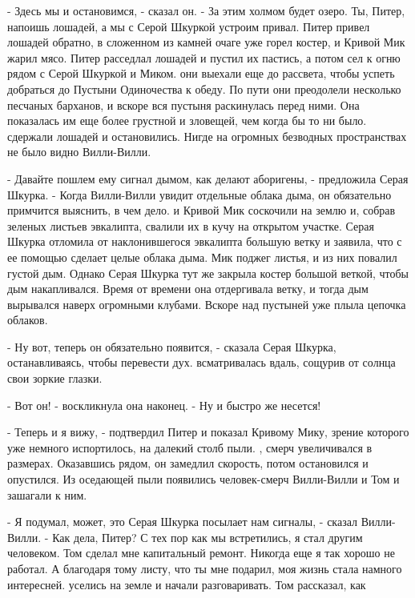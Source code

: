 \par- Здесь мы и остановимся, - сказал он. - За этим холмом будет 
озеро. Ты, Питер, напоишь лошадей, а мы с Серой Шкуркой устроим 
привал.
 Питер привел лошадей обратно, в сложенном из камней очаге 
уже горел костер, и Кривой Мик жарил мясо. Питер расседлал лошадей и 
пустил их пастись, а потом сел к огню рядом с Серой Шкуркой и Миком.
 они выехали еще до рассвета, чтобы успеть добраться до 
Пустыни Одиночества к обеду. По пути они преодолели несколько песчаных 
барханов, и вскоре вся пустыня раскинулась перед ними. Она показалась 
им еще более грустной и зловещей, чем когда бы то ни было.
 сдержали лошадей и остановились. Нигде на огромных безводных 
пространствах не было видно Вилли-Вилли.
\par- Давайте пошлем ему сигнал дымом, как делают аборигены, - 
предложила Серая Шкурка. - Когда Вилли-Вилли увидит отдельные облака 
дыма, он обязательно примчится выяснить, в чем дело.
 и Кривой Мик соскочили на землю и, собрав зеленых листьев 
эвкалипта, свалили их в кучу на открытом участке. Серая Шкурка 
отломила от наклонившегося эвкалипта большую ветку и заявила, что с ее 
помощью сделает целые облака дыма.
 Мик поджег листья, и из них повалил густой дым. Однако 
Серая Шкурка тут же закрыла костер большой веткой, чтобы дым 
накапливался. Время от времени она отдергивала ветку, и тогда дым 
вырывался наверх огромными клубами. Вскоре над пустыней уже плыла 
цепочка облаков.
\par- Ну вот, теперь он обязательно появится, - сказала Серая Шкурка, 
останавливаясь, чтобы перевести дух.
 всматривалась вдаль, сощурив от солнца свои зоркие глазки.
\par- Вот он! - воскликнула она наконец. - Ну и быстро же несется!
\par- Теперь и я вижу, - подтвердил Питер и показал Кривому Мику, 
зрение которого уже немного испортилось, на далекий столб пыли.
, смерч увеличивался в размерах. Оказавшись рядом, он 
замедлил скорость, потом остановился и опустился. Из оседающей пыли 
появились человек-смерч Вилли-Вилли и Том и зашагали к ним.
\par- Я подумал, может, это Серая Шкурка посылает нам сигналы, - 
сказал Вилли-Вилли. - Как дела, Питер? С тех пор как мы встретились, я 
стал другим человеком. Том сделал мне капитальный ремонт. Никогда еще 
я так хорошо не работал. А благодаря тому листу, что ты мне подарил, 
моя жизнь стала намного интересней.
 уселись на земле и начали разговаривать. Том рассказал, как 
